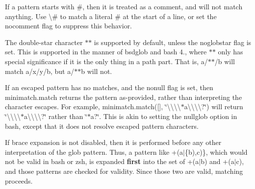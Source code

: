 If a pattern starts with {\ttfamily \#}, then it is treated as a comment, and will not match anything. Use {\ttfamily \textbackslash{}\#} to match a literal {\ttfamily \#} at the start of a line, or set the {\ttfamily nocomment} flag to suppress this behavior.

The double-\/star character {\ttfamily $\ast$$\ast$} is supported by default, unless the {\ttfamily noglobstar} flag is set. This is supported in the manner of bsdglob and bash 4., where {\ttfamily $\ast$$\ast$} only has special significance if it is the only thing in a path part. That is, {\ttfamily a/$\ast$$\ast$/b} will match {\ttfamily a/x/y/b}, but {\ttfamily a/$\ast$$\ast$b} will not.

If an escaped pattern has no matches, and the {\ttfamily nonull} flag is set, then minimatch.\+match returns the pattern as-\/provided, rather than interpreting the character escapes. For example, {\ttfamily minimatch.\+match(\mbox{[}\mbox{]}, \char`\"{}\textbackslash{}\textbackslash{}\textbackslash{}\textbackslash{}$\ast$a\textbackslash{}\textbackslash{}\textbackslash{}\textbackslash{}?\char`\"{})} will return {\ttfamily \char`\"{}\textbackslash{}\textbackslash{}\textbackslash{}\textbackslash{}$\ast$a\textbackslash{}\textbackslash{}\textbackslash{}\textbackslash{}?\char`\"{}} rather than {\ttfamily \char`\"{}$\ast$a?\char`\"{}}. This is akin to setting the {\ttfamily nullglob} option in bash, except that it does not resolve escaped pattern characters.

If brace expansion is not disabled, then it is performed before any other interpretation of the glob pattern. Thus, a pattern like {\ttfamily +(a$\vert$\{b),c)\}}, which would not be valid in bash or zsh, is expanded {\bfseries first} into the set of {\ttfamily +(a$\vert$b)} and {\ttfamily +(a$\vert$c)}, and those patterns are checked for validity. Since those two are valid, matching proceeds. 